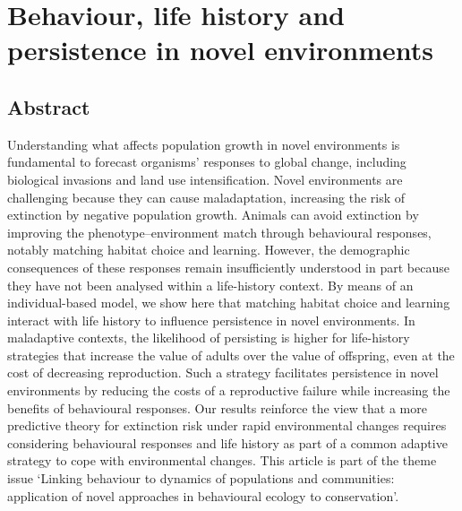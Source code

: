 \chapter[Behaviour and life history in novel environments]{Behaviour, life history and persistence in novel environments}\label{ch:LH-Behaviour model}

\clearpage

\section*{Abstract}
Understanding what affects population growth in novel environments is
fundamental to forecast organisms’ responses to global change, including
biological invasions and land use intensification. Novel environments are
challenging because they can cause maladaptation, increasing the risk of
extinction by negative population growth. Animals can avoid extinction by
improving the phenotype–environment match through behavioural
responses, notably matching habitat choice and learning. However, the 
demographic consequences of these responses remain insufficiently understood in
part because they have not been analysed within a life-history context. By
means of an individual-based model, we show here that matching habitat
choice and learning interact with life history to influence persistence in
novel environments. In maladaptive contexts, the likelihood of persisting is
higher for life-history strategies that increase the value of adults over the
value of offspring, even at the cost of decreasing reproduction. Such a strategy
facilitates persistence in novel environments by reducing the costs of a 
reproductive failure while increasing the benefits of behavioural responses. Our
results reinforce the view that a more predictive theory for extinction risk
under rapid environmental changes requires considering behavioural
responses and life history as part of a common adaptive strategy to cope
with environmental changes.
This article is part of the theme issue ‘Linking behaviour to dynamics of
populations and communities: application of novel approaches in behavioural
ecology to conservation’.



